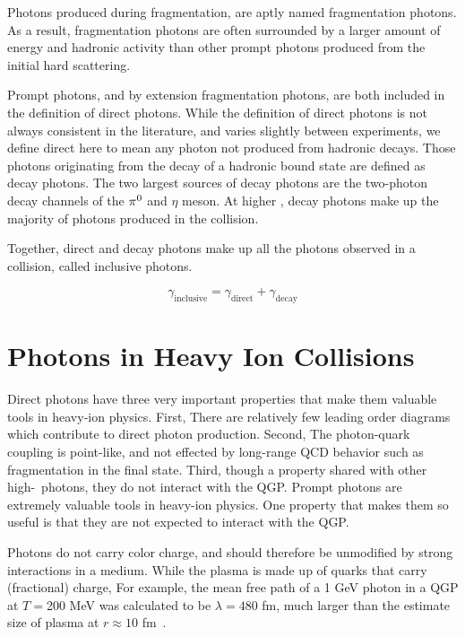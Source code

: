 
Photons produced during fragmentation, are aptly named fragmentation photons. As a result, fragmentation photons are often surrounded by a larger amount of energy and hadronic activity than other prompt photons produced from the initial hard scattering.

Prompt photons, and by extension fragmentation photons, are both included in the definition of direct photons. While the definition of direct photons is not always consistent in the literature, and varies slightly between experiments, we define direct here to mean any photon not produced from hadronic decays. Those photons originating from the decay of a hadronic bound state are defined as decay photons. The two largest sources of decay photons are the two-photon decay channels of the $\pi^0$ and $\eta$ meson. At higher \pt, decay photons make up the majority of photons produced in the collision.

Together, direct and decay photons make up all the photons observed in a collision, called inclusive photons.

\begin{equation}
  \gamma_\mathrm{inclusive} = \gamma_\mathrm{direct} + \gamma_\mathrm{decay}
\end{equation}

\section{Photons in Heavy Ion Collisions}
Direct photons have three very important properties that make them valuable tools in heavy-ion physics. First, There are relatively few leading order diagrams which contribute to direct photon production. Second, The photon-quark coupling is point-like, and not effected by long-range QCD behavior such as fragmentation in the final state. Third, though a property shared with other high-\pt~photons, they do not interact with the QGP. Prompt photons are extremely valuable tools in heavy-ion physics. One property that makes them so useful is that they are not expected to interact with the QGP.

Photons do not carry color charge, and should therefore be unmodified by strong interactions in a medium. While the plasma is made up of quarks that carry (fractional) charge, For example, the mean free path of a 1 GeV photon in a QGP at $T=$200 MeV was calculated to be  $\lambda=480$ fm, much larger than the estimate size of plasma at  $r \approx 10$ fm~\cite{David2020}.

